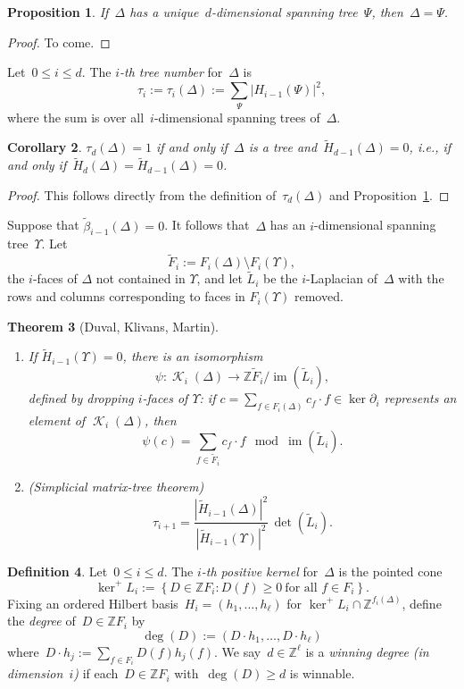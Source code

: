 \documentclass[12pt]{article}
\newcommand{\Z}{\mathbb{Z}}
\newcommand{\tL}{\widetilde{L}}
\newcommand{\tF}{\widetilde{F}}
\newcommand{\tH}{\widetilde{H}}
\newcommand{\tb}{\tilde{\beta}}
\DeclareMathOperator{\im}{\mathrm{im}}
\DeclareMathOperator{\crit}{\mathcal{K}}
\newtheorem{theorem}{Theorem}[section]
\newtheorem{cor}[theorem]{Corollary}
\newtheorem{prop}[theorem]{Proposition}
\theoremstyle{definition}
\newtheorem{definition}[theorem]{Definition}
\theoremstyle{remark}
\begin{document}
\begin{prop}\label{prop: unique tree} If~$\Delta$ has a unique~$d$-dimensional spanning tree~$\Psi$,
  then~$\Delta=\Psi$.
\end{prop}
\begin{proof}
  To come.
\end{proof}

Let~$0\leq i\leq d$.  The {\em $i$-th tree number} for~$\Delta$ is
\[
  \tau_i:=\tau_i(\Delta):=\sum_{\Psi}|H_{i-1}(\Psi)|^2,
\]
where the sum is over all~$i$-dimensional spanning trees of~$\Delta$.

\begin{cor}\label{cor: tree number}
  $\tau_d(\Delta)=1$ if and only if~$\Delta$ is a tree
  and~$\tH_{d-1}(\Delta)=0$, i.e., if and only
  if~$\tH_d(\Delta)=\tH_{d-1}(\Delta)=0$.
\end{cor}
\begin{proof}
  This follows directly from the definition of~$\tau_d(\Delta)$ and
  Proposition~\ref{prop: unique tree}.
\end{proof}

Suppose that $\tb_{i-1}(\Delta)=0$.  It follows that~$\Delta$ has an
$i$-dimensional spanning tree~$\Upsilon$. Let
\[
  \tF_i:=F_i(\Delta)\setminus F_i(\Upsilon),
\]
the $i$-faces of $\Delta$ not contained in $\Upsilon$, and let $\tL_i$ be the
$i$-Laplacian of~$\Delta$ with the rows and columns corresponding to faces in
$F_i(\Upsilon)$ removed.

\begin{theorem}[Duval, Klivans, Martin]\label{thm: simplicial matrix-tree}
  \leavevmode
\begin{enumerate}[label={\rm (\roman*)}]
  \item\label{thm: smt1}  If $\tH_{i-1}(\Upsilon)=0$, there is an isomorphism
    \[
      \psi\colon\crit_i(\Delta)\to \Z\tF_i/\im(\tL_i),
    \]
    defined by dropping $i$-faces
    of $\Upsilon$:   if
    $c=\sum_{f\in F_i(\Delta)}c_f\cdot f\in\ker\partial_i$ represents an element
    of $\crit_i(\Delta)$, then 
    \[
      \psi(c)=\sum_{f\in\tF_i}c_f\cdot f\ \bmod\im(\tL_i).
  \]
\item\label{thm: smt2} (Simplicial matrix-tree theorem)
  \[
    \tau_{i+1}=\frac{|\tH_{i-1}(\Delta)|^2}{|\tH_{i-1}(\Upsilon)|^2}\,\det(\tL_i).
  \]
\end{enumerate}
\end{theorem}

\begin{definition} Let~$0\leq i\leq d$.  The {\em $i$-th positive kernel}
  for~$\Delta$ is the pointed cone
  \[
    \ker^{+}L_i:=\left\{ D\in \Z F_i: D(f)\geq0\ \text{for all $f\in F_i$}
    \right\}.
  \]
  Fixing an ordered Hilbert basis~$H_i=(h_1,\dots,h_{\ell})$ for
  $\ker^{+}L_i\cap\Z^{f_i(\Delta)}$, define the {\em degree}
  of~$D\in\Z F_i$ by
  \[
    \deg(D):= (D\cdot h_1,\dots, D\cdot h_{\ell})
  \]
  where~$D\cdot h_j:=\sum_{f\in F_i}D(f)h_j(f)$.  
  We say~$d\in\Z^{\ell}$ is a {\em winning degree (in dimension~$i$)} if each~$D\in \Z F_i$
  with~$\deg(D)\geq d$ is winnable.
\end{definition}
\end{document}
